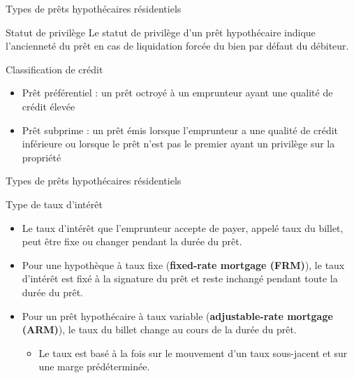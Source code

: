 \documentclass[10pt,a4paper]{beamer}
\begin{document}
\begin{frame}{Types de prêts hypothécaires résidentiels}
\begin{block}{Statut de privilège}
Le statut de privilège d’un prêt hypothécaire indique l’ancienneté du prêt en cas de liquidation forcée du bien par défaut du débiteur.
\end{block}
\begin{block}{Classification de crédit}
\begin{itemize}[label=\bullet]
\item Prêt préférentiel : un prêt octroyé à un emprunteur ayant une qualité de crédit élevée 
\item Prêt subprime : un prêt émis lorsque l'emprunteur a une qualité de crédit inférieure ou lorsque le prêt n'est pas le premier ayant un privilège sur la propriété
\end{itemize}
\end{block}
\end{frame}

\begin{frame}{Types de prêts hypothécaires résidentiels}
\begin{block}{Type de taux d'intérêt}
\begin{itemize}[label=\bullet]
\item Le taux d'intérêt que l'emprunteur accepte de payer, appelé taux du billet, peut être fixe ou changer pendant la durée du prêt.
\item Pour une hypothèque à taux fixe (\textbf{fixed-rate mortgage (FRM)}), le taux d'intérêt est fixé à la signature du prêt et reste inchangé pendant toute la durée du prêt.
\item Pour un prêt hypothécaire à taux variable (\textbf{adjustable-rate mortgage (ARM)}),  le taux du billet change au cours de la durée du prêt.
\begin{itemize}[label=\bullet]
\item Le taux est basé à la fois sur le mouvement d'un taux sous-jacent et sur une marge prédéterminée.
\end{itemize}
\end{itemize}
\end{block}
\end{frame}
\end{document}
